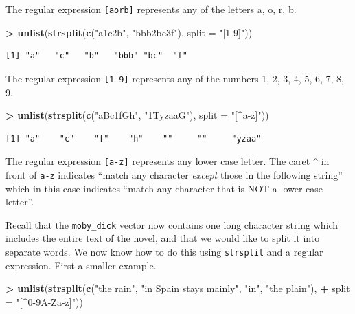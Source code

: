 \documentclass[
]{krantz}
\makeatletter
\newenvironment{Shaded}{\begin{snugshade}}{\end{snugshade}}
\newcommand{\DataTypeTok}[1]{\textcolor[rgb]{0.27,0.27,0.27}{#1}}
\newcommand{\KeywordTok}[1]{\textcolor[rgb]{0.27,0.27,0.27}{\textbf{#1}}}
\newcommand{\NormalTok}[1]{#1}
\newcommand{\OperatorTok}[1]{\textcolor[rgb]{0.43,0.43,0.43}{\textbf{#1}}}
\newcommand{\StringTok}[1]{\textcolor[rgb]{0.5,0.5,0.5}{#1}}
\newenvironment{kframe}{%
\medskip{}
\setlength{\fboxsep}{.8em}
 \def\at@end@of@kframe{}%
 \ifinner\ifhmode%
  \def\at@end@of@kframe{\end{minipage}}%
  \begin{minipage}{\columnwidth}%
 \fi\fi%
 \def\FrameCommand##1{\hskip\@totalleftmargin \hskip-\fboxsep
 \colorbox{shadecolor}{##1}\hskip-\fboxsep
     \hskip-\linewidth \hskip-\@totalleftmargin \hskip\columnwidth}%
 \MakeFramed {\advance\hsize-\width
   \@totalleftmargin\z@ \linewidth\hsize
   \@setminipage}}%
 {\par\unskip\endMakeFramed%
 \at@end@of@kframe}
\renewenvironment{Shaded}{\begin{kframe}}{\end{kframe}}
\makeatother
\begin{document}
The regular expression \texttt{{[}aorb{]}} represents any of the letters a, o, r, b.

\begin{Shaded}
\begin{Highlighting}[]
\OperatorTok{\textgreater{}}\StringTok{ }\KeywordTok{unlist}\NormalTok{(}\KeywordTok{strsplit}\NormalTok{(}\KeywordTok{c}\NormalTok{(}\StringTok{"a1c2b"}\NormalTok{, }\StringTok{"bbb2bc3f"}\NormalTok{), }\DataTypeTok{split =} \StringTok{"[1{-}9]"}\NormalTok{))}
\end{Highlighting}
\end{Shaded}

\begin{verbatim}
[1] "a"   "c"   "b"   "bbb" "bc"  "f"  
\end{verbatim}

The regular expression \texttt{{[}1-9{]}} represents any of the numbers 1, 2, 3, 4, 5, 6, 7, 8, 9.

\begin{Shaded}
\begin{Highlighting}[]
\OperatorTok{\textgreater{}}\StringTok{ }\KeywordTok{unlist}\NormalTok{(}\KeywordTok{strsplit}\NormalTok{(}\KeywordTok{c}\NormalTok{(}\StringTok{"aBc1fGh"}\NormalTok{, }\StringTok{"1TyzaaG"}\NormalTok{), }\DataTypeTok{split =} \StringTok{"[\^{}a{-}z]"}\NormalTok{))}
\end{Highlighting}
\end{Shaded}

\begin{verbatim}
[1] "a"    "c"    "f"    "h"    ""     ""     "yzaa"
\end{verbatim}

The regular expression \texttt{{[}a-z{]}} represents any lower case letter. The caret \texttt{\^{}} in front of \texttt{a-z} indicates ``match any character \emph{except} those in the following string'' which in this case indicates ``match any character that is NOT a lower case letter''.

Recall that the \texttt{moby\_dick} vector now contains one long character string which includes the entire text of the novel, and that we would like to split it into separate words. We now know how to do this using \texttt{strsplit} and a regular expression. First a smaller example.

\begin{Shaded}
\begin{Highlighting}[]
\OperatorTok{\textgreater{}}\StringTok{ }\KeywordTok{unlist}\NormalTok{(}\KeywordTok{strsplit}\NormalTok{(}\KeywordTok{c}\NormalTok{(}\StringTok{"the rain"}\NormalTok{, }\StringTok{"in Spain stays mainly"}\NormalTok{, }\StringTok{"in"}\NormalTok{, }\StringTok{"the plain"}\NormalTok{), }
\OperatorTok{+}\StringTok{                 }\DataTypeTok{split =} \StringTok{"[\^{}0{-}9A{-}Za{-}z]"}\NormalTok{))}
\end{Highlighting}
\end{Shaded}
\end{document}
